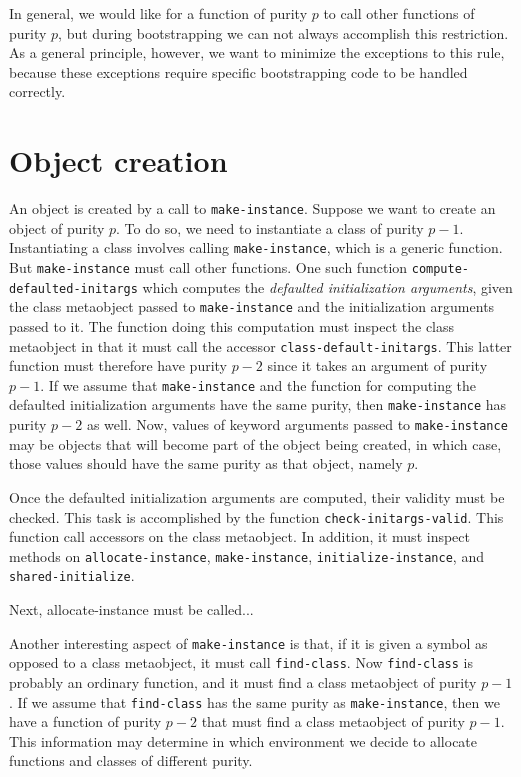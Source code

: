 In general, we would like for a function of purity $p$ to call other
functions of purity $p$, but during bootstrapping we can not always
accomplish this restriction.  As a general principle, however, we want
to minimize the exceptions to this rule, because these exceptions
require specific bootstrapping code to be handled correctly.

\section{Object creation}
\label{sec-app-bootstrapping-object-allocation}

An object is created by a call to \texttt{make-instance}.
Suppose we want to create an object of purity $p$.  To do so, we
need to instantiate a class of purity $p-1$.  Instantiating a class
involves calling \texttt{make-instance}, which is a generic
function.  But \texttt{make-instance} must call other functions.  One
such function \texttt{compute-defaulted-initargs} which
computes the \emph{defaulted initialization arguments},
given the class metaobject passed to \texttt{make-instance} and the
initialization arguments passed to it.  The function doing this
computation must inspect the class metaobject in that it must call the
accessor \texttt{class-default-initargs}.  This latter function must
therefore have purity $p-2$ since it takes an argument of purity
$p-1$.  If we assume that \texttt{make-instance} and the function for
computing the defaulted initialization arguments have the same purity,
then \texttt{make-instance} has purity $p-2$ as well.  Now, values of
keyword arguments passed to \texttt{make-instance} may be objects that
will become part of the object being created, in which case, those
values should have the same purity as that object, namely $p$.

Once the defaulted initialization arguments are computed, their
validity must be checked.  This task is accomplished by the function
\texttt{check-initargs-valid}.  This function call accessors on the
class metaobject.  In addition, it must inspect methods on
\texttt{allocate-instance}, \texttt{make-instance},
\texttt{initialize-instance}, and \texttt{shared-initialize}.

Next, allocate-instance must be called...

Another interesting aspect of \texttt{make-instance} is that, if it is
given a symbol as opposed to a class metaobject, it must call
\texttt{find-class}.  Now \texttt{find-class} is probably an ordinary
function, and it must find a class metaobject of purity $p-1$.  If we
assume that \texttt{find-class} has the same purity as
\texttt{make-instance}, then we have a function of purity $p-2$ that
must find a class metaobject of purity $p-1$.  This information may
determine in which environment we decide to allocate functions and
classes of different purity.


